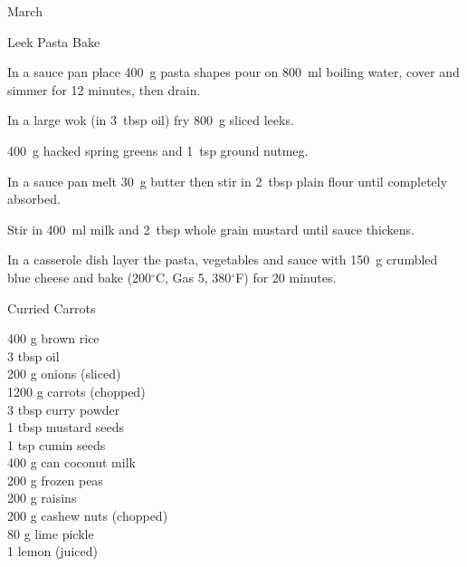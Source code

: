 \begin{menu}{March}
\begin{recipe}{2}{Leek Pasta Bake}
    \begin{instructions}
    \item 
      In a
      sauce pan
      place
      400~g  pasta shapes
      pour on
      800~ml  boiling water,
      cover and simmer for 12 minutes, then drain.
    \item 
        In a large wok
        (in 3~tbsp  oil)
        fry
        800~g sliced leeks.
      \item 400~g hacked spring greens
        and
        1~tsp  ground nutmeg.
      \item 
        In a sauce pan melt
        30~g  butter
        then stir in
        2~tbsp  plain flour
        until completely absorbed.
      \item 
        Stir in
        400~ml  milk
        and
        2~tbsp  whole grain mustard
        until sauce thickens.
      \item 
        In a casserole dish
        layer the pasta, vegetables and sauce with
        150~g crumbled blue cheese
        and bake
        (200$^{\circ}$C, Gas 5, 380$^{\circ}$F)
        for 20 minutes.
      
    \end{instructions}
    \end{recipe}%
  
    \begin{recipe}{2}{Curried Carrots}%
		\begin{ingredients}
		400 g brown rice  \\
	3 tbsp oil  \\
	200 g onions (sliced) \\
	1200 g carrots (chopped) \\
	3 tbsp curry powder  \\
	1 tbsp mustard seeds  \\
	1 tsp cumin seeds  \\
	400 g can coconut milk  \\
	200 g frozen peas  \\
	200 g raisins  \\
	200 g cashew nuts (chopped) \\
	80 g lime pickle  \\
	1  lemon (juiced) \\
	
		\end{ingredients}
	

\end{recipe}
\end{menu}
